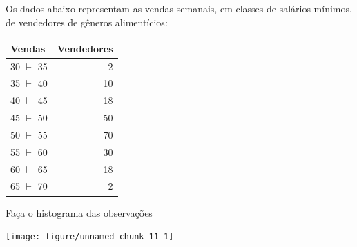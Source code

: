 \documentclass[a4paper,11pt,fleqn]{article}\usepackage[]{graphicx}\usepackage[]{color}
\newenvironment{knitrout}{}{} %
\theoremstyle{definition}
\begin{document}
\begin{compactenum}[7.] %
\item Os dados abaixo representam as vendas semanais, em classes de
  salários mínimos, de vendedores de gêneros alimentícios:
\begin{table}[ht]
\centering
\begin{tabular}{lr}
  \hline
Vendas & Vendedores \\ 
  \hline
30 $\vdash$ 35 & 2 \\ 
  35 $\vdash$ 40 & 10 \\ 
  40 $\vdash$ 45 & 18 \\ 
  45 $\vdash$ 50 & 50 \\ 
  50 $\vdash$ 55 & 70 \\ 
  55 $\vdash$ 60 & 30 \\ 
  60 $\vdash$ 65 & 18 \\ 
  65 $\vdash$ 70 & 2 \\ 
   \hline
\end{tabular}
\end{table}

\begin{compactenum}
\item Faça o histograma das observações
\begin{knitrout}\small
{}\color{fgcolor}

{\centering \texttt{[image: figure/unnamed-chunk-11-1]} 

}




\end{knitrout}
\end{compactenum}
\end{compactenum}
\end{document}
